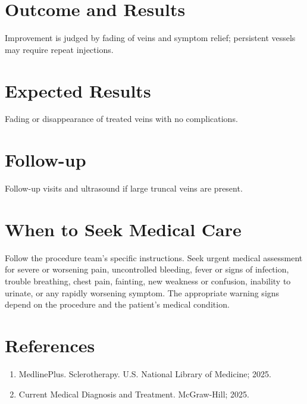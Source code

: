 \section*{Outcome and Results}
Improvement is judged by fading of veins and symptom relief; persistent vessels may require repeat injections.

\section*{Expected Results}
Fading or disappearance of treated veins with no complications.

\section*{Follow-up}
Follow-up visits and ultrasound if large truncal veins are present.

\section*{When to Seek Medical Care}
Follow the procedure team's specific instructions. Seek urgent medical assessment for severe or worsening pain, uncontrolled bleeding, fever or signs of infection, trouble breathing, chest pain, fainting, new weakness or confusion, inability to urinate, or any rapidly worsening symptom. The appropriate warning signs depend on the procedure and the patient's medical condition.

\section*{References}
\begin{enumerate}
  \item MedlinePlus. Sclerotherapy. U.S. National Library of Medicine; 2025.
  \item Current Medical Diagnosis and Treatment. McGraw-Hill; 2025.
\end{enumerate}

\clearpage
